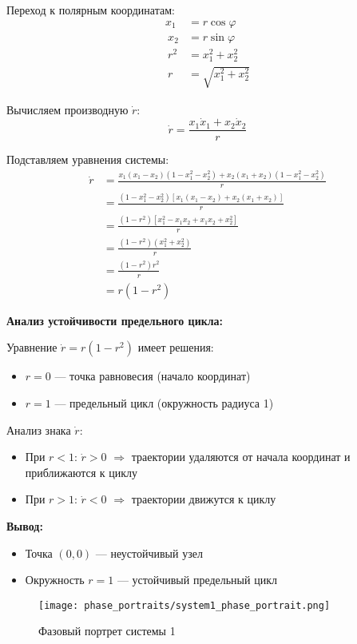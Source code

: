 Переход к полярным координатам:
\begin{align}
x_1 &= r\cos\varphi \\\
x_2 &= r\sin\varphi \\\
r^2 &= x_1^2 + x_2^2 \\\
r &= \sqrt{x_1^2 + x_2^2}
\end{align}

Вычисляем производную $\dot{r}$:
$$\dot{r} = \frac{x_1\dot{x}_1 + x_2\dot{x}_2}{r}$$

Подставляем уравнения системы:
\begin{align}
\dot{r} &= \frac{x_1(x_1 - x_2)(1 - x_1^2 - x_2^2) + x_2(x_1 + x_2)(1 - x_1^2 - x_2^2)}{r} \\\
&= \frac{(1 - x_1^2 - x_2^2)[x_1(x_1 - x_2) + x_2(x_1 + x_2)]}{r} \\\
&= \frac{(1 - r^2)[x_1^2 - x_1x_2 + x_1x_2 + x_2^2]}{r} \\\
&= \frac{(1 - r^2)(x_1^2 + x_2^2)}{r} \\\
&= \frac{(1 - r^2)r^2}{r} \\\
&= r(1 - r^2)
\end{align}

\textbf{Анализ устойчивости предельного цикла:}

Уравнение $\dot{r} = r(1 - r^2)$ имеет решения:
\begin{itemize}
\item $r = 0$ --- точка равновесия (начало координат)
\item $r = 1$ --- предельный цикл (окружность радиуса 1)
\end{itemize}

Анализ знака $\dot{r}$:
\begin{itemize}
\item При $r < 1$: $\dot{r} > 0$ $\Rightarrow$ траектории удаляются от начала координат и приближаются к циклу
\item При $r > 1$: $\dot{r} < 0$ $\Rightarrow$ траектории движутся к циклу
\end{itemize}

\textbf{Вывод:}
\begin{itemize}
\item Точка $(0,0)$ --- неустойчивый узел
\item Окружность $r = 1$ --- устойчивый предельный цикл
\end{itemize}

\begin{figure}[H]
\centering
\texttt{[image: phase\_portraits/system1\_phase\_portrait.png]}
\caption{Фазовый портрет системы 1}
\label{fig:system1_phase_portrait}
\end{figure}

